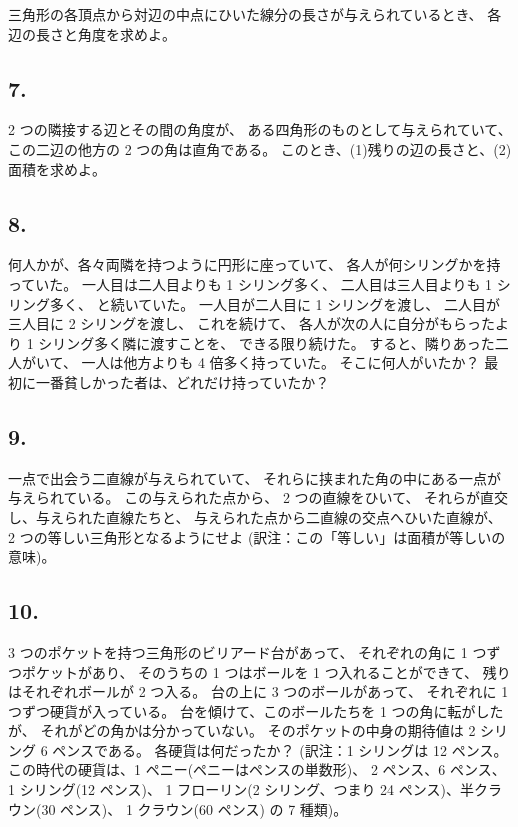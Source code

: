 三角形の各頂点から対辺の中点にひいた線分の長さが与えられているとき、
各辺の長さと角度を求めよ。

\subsection*{7.}

 2 つの隣接する辺とその間の角度が、
ある四角形のものとして与えられていて、
この二辺の他方の 2 つの角は直角である。
このとき、(1)残りの辺の長さと、(2)面積を求めよ。
\begin{flushright}
[4 or 5/89]
\end{flushright}

\subsection*{8.}

何人かが、各々両隣を持つように円形に座っていて、
各人が何シリングかを持っていた。
一人目は二人目よりも 1 シリング多く、
二人目は三人目よりも 1 シリング多く、
と続いていた。
一人目が二人目に 1 シリングを渡し、
二人目が三人目に 2 シリングを渡し、
これを続けて、
各人が次の人に自分がもらったより 1 シリング多く隣に渡すことを、
できる限り続けた。
すると、隣りあった二人がいて、
一人は他方よりも 4 倍多く持っていた。
そこに何人がいたか？
最初に一番貧しかった者は、どれだけ持っていたか？
\begin{flushright}
[3/89]
\end{flushright}

\subsection*{9.}

一点で出会う二直線が与えられていて、
それらに挟まれた角の中にある一点が与えられている。
この与えられた点から、 2 つの直線をひいて、
それらが直交し、与えられた直線たちと、
与えられた点から二直線の交点へひいた直線が、
 2 つの等しい三角形となるようにせよ
(訳注：この「等しい」は面積が等しいの意味)。
\begin{flushright}
[11/76]
\end{flushright}


\subsection*{10.}

 3 つのポケットを持つ三角形のビリアード台があって、
それぞれの角に 1 つずつポケットがあり、
そのうちの 1 つはボールを 1 つ入れることができて、
残りはそれぞれボールが 2 つ入る。
台の上に 3 つのボールがあって、
それぞれに 1 つずつ硬貨が入っている。
台を傾けて、このボールたちを 1 つの角に転がしたが、
それがどの角かは分かっていない。
そのポケットの中身の期待値は 2 シリング 6 ペンスである。
各硬貨は何だったか？
(訳注：1 シリングは 12 ペンス。
この時代の硬貨は、1 ペニー(ペニーはペンスの単数形)、
2 ペンス、6 ペンス、1 シリング(12 ペンス)、
1 フローリン(2 シリング、つまり 24 ペンス)、半クラウン(30 ペンス)、
1 クラウン(60 ペンス) の 7 種類)。
\begin{flushright}
[8/90]
\end{flushright}


